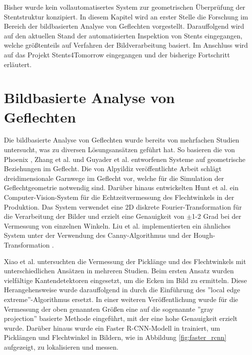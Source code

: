 Bisher wurde kein vollautomatisertes System zur geometrischen Überprüfung der Stentstruktur konzipiert. In diesem Kapitel wird an erster Stelle die Forschung im Bereich der bildbasierten Analyse von Geflechten vorgestellt. Darauffolgend wird auf den aktuellen Stand der automatisierten Inspektion von Stents eingegangen, welche größtenteils auf Verfahren der Bildverarbeitung basiert. Im Anschluss wird auf das Projekt Stents4Tomorrow \cite{flechtmaschine} eingegangen und der bisherige Fortschritt erläutert.


\section{Bildbasierte Analyse von Geflechten}
Die bildbasierte Analyse von Geflechten wurde bereits von mehrfachen Studien untersucht, was zu diversen Lösungsansätzen geführt hat. So basieren die von Phoenix \cite{phoenix1978mechanical}, Zhang et al. \cite{zhang1999analysis} und Guyader et al. \cite{guyader2013analysis} entworfenen Systeme auf geometrische Beziehungen im Geflecht. Die von Alpyildiz \cite{alpyildiz20123d} veröffentlichte Arbeit schlägt dreidimensionale Garnwege im Geflecht vor, welche für die Simulation der Geflechtgeometrie notwendig sind. Darüber hinaus entwickelten Hunt et al. \cite{hunt2019machine} ein Computer-Vision-System für die Echtzeitvermessung des Flechtwinkels in der Produktion. Das System verwendet eine 2D diskrete Fourier-Transformation für die Verarbeitung der Bilder und erzielt eine Genauigkeit von $\pm$1-2 Grad bei der Vermessung von einzelnen Winkeln. \cite{hunt2019machine} Liu et al. \cite{liu2019automatic} implementierten ein ähnliches System unter der Verwendung des Canny-Algorithmus \cite{canny1986computational} und der Hough-Transformation \cite{duda1972use}.

\mypar Xiao et al. untersuchten die Vermessung der Picklänge und des Flechtwinkels mit unterschiedlichen Ansätzen in mehreren Studien. Beim ersten Ansatz \cite{xiao2018measurement} wurden vielfältige Kantendetektoren eingesetzt, um die Ecken im Bild zu ermitteln. Diese Herangehensweise wurde darauffolgend in \cite{xiao2019surface} durch die Einführung des ''local edge extreme''-Algorithmus ersetzt. In einer weiteren Veröffentlichung \cite{pei2019surface} wurde für die Vermessung der oben genannten Größen eine auf die sogenannte ''gray projection'' basierte Methode eingeführt, mit der eine hohe Genauigkeit erzielt wurde. Darüber hinaus wurde ein Faster R-CNN-Modell in \cite{xiao2020surface} trainiert, um Picklängen und Flechtwinkel in Bildern, wie in Abbildung \ref{fig:faster_rcnn} aufgezeigt, zu lokalisieren und messen.

